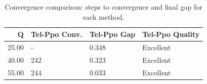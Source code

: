 \begin{table}[htbp]
\centering
\caption{Convergence comparison: steps to convergence and final gap for each method.}
\label{tab:convergence_comparison}
\begin{tabular}{rlll}
\toprule
Q & Tel-Ppo Conv. & Tel-Ppo Gap & Tel-Ppo Quality \\
\midrule
25.00 & - & 0.348 & Excellent \\
40.00 & 242 & 0.323 & Excellent \\
55.00 & 244 & 0.033 & Excellent \\
\bottomrule
\end{tabular}

\end{table}

